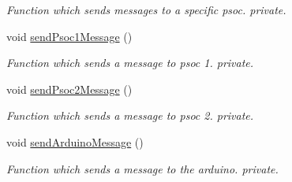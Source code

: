 \begin{DoxyCompactItemize}
\begin{DoxyCompactList}\small\item\em Function which sends messages to a specific psoc. private. \end{DoxyCompactList}\item 
void \hyperlink{class_i2_c__reg_ad7edf2735cca77a30cd694105c45866a}{send\+Psoc1\+Message} ()
\begin{DoxyCompactList}\small\item\em Function which sends a message to psoc 1. private. \end{DoxyCompactList}\item 
void \hyperlink{class_i2_c__reg_a6776bfe77df2a4de2c0e53071d972993}{send\+Psoc2\+Message} ()
\begin{DoxyCompactList}\small\item\em Function which sends a message to psoc 2. private. \end{DoxyCompactList}\item 
void \hyperlink{class_i2_c__reg_aa95ab17a2bba34006b163f245513dd18}{send\+Arduino\+Message} ()
\begin{DoxyCompactList}\small\item\em Function which sends a message to the arduino. private. \end{DoxyCompactList}\end{DoxyCompactItemize}

